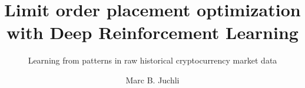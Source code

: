 \documentclass[whitelogo]{tudelft-report}
\begin{document}
\frontmatter


\title[tudelft-white]{Limit order placement optimization with Deep Reinforcement Learning}
\subtitle[tudelft-black]{Learning from patterns in raw historical cryptocurrency market data}
\author[tudelft-white]{Marc B. Juchli}








\tableofcontents

\mainmatter









\appendix

%


\end{document}
